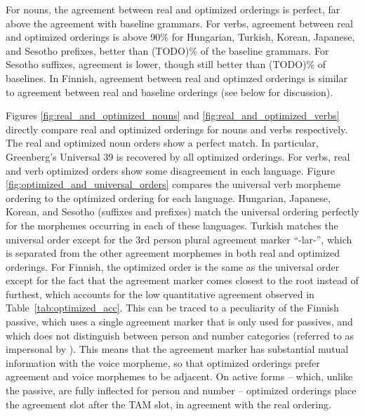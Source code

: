 \documentclass[11pt,letterpaper]{article}
\newcommand{\citep}{\parencite}
\newcommand\mhahn[1]{{\color{red}(#1)}}
\begin{document}
For nouns, the agreement between real and optimized orderings is perfect, far above the agreement with baseline grammars. %
For verbs, agreement between real and optimized orderings is above 90\% for Hungarian, Turkish, Korean, Japanese, and Sesotho prefixes, better than \mhahn{TODO}\% of the baseline grammars. %
For Sesotho suffixes, agreement is lower, though still better than \mhahn{TODO}\% of baselines.
In Finnish, agreement between real and optimzed orderings is similar to agreement between real and baseline orderings (see below for discussion).

Figures \ref{fig:real_and_optimized_nouns} and \ref{fig:real_and_optimized_verbs} directly compare real and optimized orderings for nouns and verbs respectively.
The real and optimized noun orders show a perfect match.
In particular, Greenberg's Universal 39 is recovered by all optimized orderings.
For verbs, real and verb optimized orders show some disagreement in each language.
Figure \ref{fig:optimized_and_universal_orders} compares the universal verb morpheme ordering to the optimized ordering for each language.
Hungarian, Japanese, Korean, and Sesotho (suffixes and prefixes) match the universal ordering perfectly for the morphemes occurring in each of these languages. 
Turkish matches the universal order except for the 3rd person plural agreement marker ``-lar-'', which is separated from the other agreement morphemes in both real and optimized orderings.
For Finnish, the optimized order is the same as the universal order except for the fact that the agreement marker comes closest to the root instead of furthest, which accounts for the low quantitative agreement observed in Table~\ref{tab:optimized_acc}.
This can be traced to a peculiarity of the Finnish passive, which uses a single agreement marker that is only used for passives, and which does not distinguish between person and number categories (referred to as impersonal by \citep[Section 69]{karlsson1999finnish}).
This means that the agreement marker has substantial mutual information with the voice morpheme, so that optimized orderings prefer agreement and voice morphemes to be adjacent.
On active forms -- which, unlike the passive, are fully inflected for person and number -- optimized orderings place the agreement slot after the TAM slot, in agreement with the real ordering.
\end{document}
